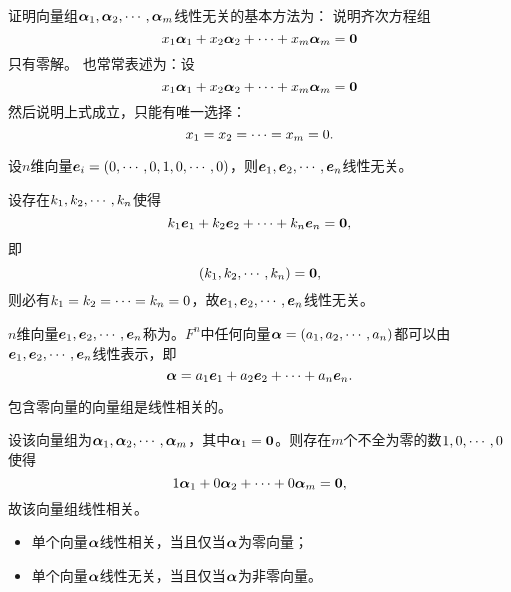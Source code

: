 \begin{frame}
证明向量组$\boldsymbol{\alpha}_1,\boldsymbol{\alpha}_2,\cdots,\boldsymbol{\alpha}_m$线性无关的基本方法为：
说明齐次方程组
$$
x_1\boldsymbol{\alpha}_1+x_2\boldsymbol{\alpha}_2+\cdots+x_m\boldsymbol{\alpha}_m=\boldsymbol{0}
$$
只有零解。
也常常表述为：设
$$
x_1\boldsymbol{\alpha}_1+x_2\boldsymbol{\alpha}_2+\cdots+x_m\boldsymbol{\alpha}_m=\boldsymbol{0}
$$
然后说明上式成立，只能有唯一选择：
$$
x_1=x_2=\cdots=x_m=0.
$$
\end{frame}

\begin{frame}
\begin{li}
  设$n$维向量${\boldsymbol{e}}_i=(0,\cdots,0,1,0,\cdots,0)$，则${\boldsymbol{e}}_1,{\boldsymbol{e}}_2,\cdots,{\boldsymbol{e}}_n$线性无关。
\end{li} \pause

\begin{jie}
  设存在$k_1,k_2,\cdots,k_n$使得
$$
k_1{\boldsymbol{e}}_1+k_2{\boldsymbol{e}}_2+\cdots+k_n{\boldsymbol{e}}_n=\boldsymbol{0},
$$
即
$$
(k_1,k_2,\cdots,k_n)=\boldsymbol{0},
$$
则必有$k_1=k_2=\cdots=k_n=0$，故${\boldsymbol{e}}_1,{\boldsymbol{e}}_2,\cdots,{\boldsymbol{e}}_n$线性无关。
\end{jie}
\end{frame}


\begin{frame}
\begin{zhu*}
  $n$维向量${\boldsymbol{e}}_1,{\boldsymbol{e}}_2,\cdots,{\boldsymbol{e}}_n$称为。$F^n$中任何向量$\boldsymbol{\alpha}=(a_1,a_2,\cdots,a_n)$都可以由${\boldsymbol{e}}_1,{\boldsymbol{e}}_2,\cdots,{\boldsymbol{e}}_n$线性表示，即
  $$
  \boldsymbol{\alpha} = a_1{\boldsymbol{e}}_1+a_2{\boldsymbol{e}}_2+\cdots+a_n{\boldsymbol{e}}_n.
  $$
\end{zhu*}
\end{frame}

\begin{frame}
\begin{li}
  包含零向量的向量组是线性相关的。
\end{li}\pause 
\begin{jie}
设该向量组为$\boldsymbol{\alpha}_1,\boldsymbol{\alpha}_2,\cdots,\boldsymbol{\alpha}_m$，其中$\boldsymbol{\alpha}_1=\boldsymbol{0}$。则存在$m$个不全为零的数$1,0,\cdots,0$使得
$$
1 \boldsymbol{\alpha}_1+0\boldsymbol{\alpha}_2+\cdots+0\boldsymbol{\alpha}_m=\boldsymbol{0},
$$
故该向量组线性相关。
\end{jie}
\end{frame}

\begin{frame}
\begin{zhu*}
  \begin{itemize}
  \item 单个向量$\boldsymbol{\alpha}$线性相关，当且仅当$\boldsymbol{\alpha}$为零向量；
  \item 单个向量$\boldsymbol{\alpha}$线性无关，当且仅当$\boldsymbol{\alpha}$为非零向量。        
  \end{itemize}
\end{zhu*}
\end{frame}

